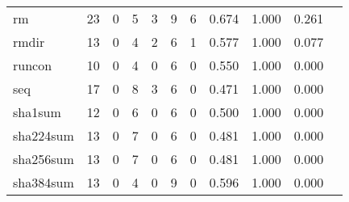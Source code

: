 \begin{longtable}{lp{1.10cm}p{1.10cm}p{1.10cm}p{1.10cm}p{1.10cm}p{1.10cm}p{1.10cm}p{1.10cm}p{1.10cm}p{1.10cm}}
rm        &                     23 &                                  0 &                                 5 &                                3 &                                 9 &                               6 &                          0.674 &                                 1.000 &                               0.261 \\
rmdir     &                     13 &                                  0 &                                 4 &                                2 &                                 6 &                               1 &                          0.577 &                                 1.000 &                               0.077 \\
runcon    &                     10 &                                  0 &                                 4 &                                0 &                                 6 &                               0 &                          0.550 &                                 1.000 &                               0.000 \\
seq       &                     17 &                                  0 &                                 8 &                                3 &                                 6 &                               0 &                          0.471 &                                 1.000 &                               0.000 \\
sha1sum   &                     12 &                                  0 &                                 6 &                                0 &                                 6 &                               0 &                          0.500 &                                 1.000 &                               0.000 \\
sha224sum &                     13 &                                  0 &                                 7 &                                0 &                                 6 &                               0 &                          0.481 &                                 1.000 &                               0.000 \\
sha256sum &                     13 &                                  0 &                                 7 &                                0 &                                 6 &                               0 &                          0.481 &                                 1.000 &                               0.000 \\
sha384sum &                     13 &                                  0 &                                 4 &                                0 &                                 9 &                               0 &                          0.596 &                                 1.000 &                               0.000 \\

\end{longtable}
